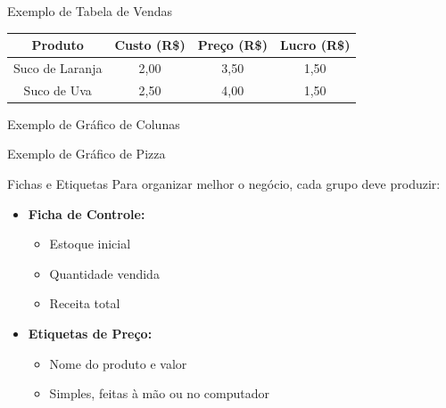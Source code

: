 \documentclass{beamer}
\begin{document}
\begin{frame}{Exemplo de Tabela de Vendas}
    \begin{tabular}{|c|c|c|c|}
        \hline
        Produto & Custo (R\$) & Preço (R\$) & Lucro (R\$) \\
        \hline
        Suco de Laranja & 2,00 & 3,50 & 1,50 \\
        Suco de Uva     & 2,50 & 4,00 & 1,50 \\
        \hline
    \end{tabular}
\end{frame}

\begin{frame}{Exemplo de Gráfico de Colunas}
\centering
{}
\end{frame}

\begin{frame}{Exemplo de Gráfico de Pizza}
\centering
{}
\end{frame}

\begin{frame}{Fichas e Etiquetas}
    Para organizar melhor o negócio, cada grupo deve produzir:
    \begin{itemize}
        \item \textbf{Ficha de Controle:} 
        \begin{itemize}
            \item Estoque inicial
            \item Quantidade vendida
            \item Receita total
        \end{itemize}
        \item \textbf{Etiquetas de Preço:} 
        \begin{itemize}
            \item Nome do produto e valor
            \item Simples, feitas à mão ou no computador
        \end{itemize}
    \end{itemize}
\end{frame}
\end{document}
